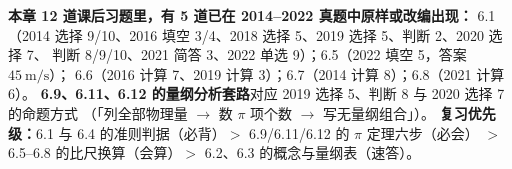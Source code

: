 
\begin{tishi}
\textbf{本章 12 道课后习题里，有 5 道已在 2014--2022 真题中原样或改编出现：}
6.1（2014 选择 9/10、2016 填空 3/4、2018 选择 5、2019 选择 5、判断 2、2020 选择 7、
判断 8/9/10、2021 简答 3、2022 单选 9）；6.5（2022 填空 5，答案 $45\ \mathrm{m/s}$）；
6.6（2016 计算 7、2019 计算 3）；6.7（2014 计算 8）；6.8（2021 计算 6）。
\textbf{6.9、6.11、6.12 的量纲分析套路}对应 2019 选择 5、判断 8 与 2020 选择 7 的命题方式
（「列全部物理量 $\to$ 数 $\pi$ 项个数 $\to$ 写无量纲组合」）。
\textbf{复习优先级：}6.1 与 6.4 的准则判据（必背）$>$ 6.9/6.11/6.12 的 $\pi$ 定理六步（必会）
$>$ 6.5--6.8 的比尺换算（会算）$>$ 6.2、6.3 的概念与量纲表（速答）。
\end{tishi}
